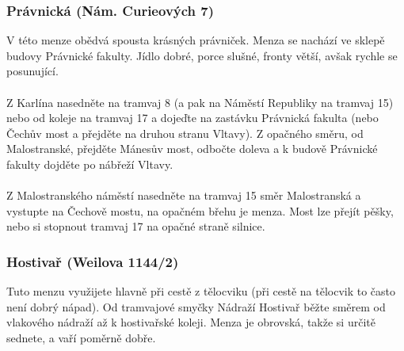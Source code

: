\subsubsection{Právnická (Nám. Curieových 7)}
V této menze obědvá spousta krásných právniček. Menza se nachází ve sklepě
budovy Právnické fakulty. Jídlo dobré, porce slušné, fronty větší, avšak rychle
se posunující.
\\\\
Z Karlína nasedněte na tramvaj 8 (a pak na Náměstí Republiky na tramvaj 15) nebo
od koleje na tramvaj 17 a dojeďte na zastávku Právnická fakulta (nebo Čechův
most a přejděte na druhou stranu Vltavy). Z opačného směru, od Malostranské,
přejděte Mánesův most, odbočte doleva a k budově Právnické fakulty dojděte po
nábřeží Vltavy.
\\\\
Z Malostranského náměstí nasedněte na tramvaj 15 směr Malostranská a vystupte na
Čechově mostu, na opačném břehu je menza. Most lze přejít pěšky, nebo si
stopnout tramvaj 17 na opačné straně silnice.


\subsubsection{Hostivař (Weilova 1144/2)}
Tuto menzu využijete hlavně při cestě z tělocviku (při cestě na tělocvik to
často není dobrý nápad). Od tramvajové smyčky Nádraží Hostivař běžte směrem od
vlakového nádraží až k hostivařské koleji. Menza je obrovská, takže si určitě
sednete, a vaří poměrně dobře.